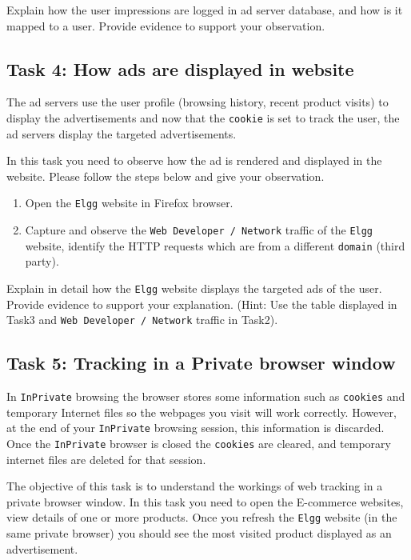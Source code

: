Explain how the user impressions are logged in ad server database, and how is it mapped to a user. 
Provide evidence to support your observation.

\subsection{Task 4: How ads are displayed in website}

The ad servers use the user profile (browsing history, recent product visits) to display the advertisements and now that the {\tt cookie} is set to track the user, 
the ad servers display the targeted advertisements. 

In this task you need to observe how the ad is rendered and displayed in the website. 
Please follow the steps below and give your observation.
\begin{enumerate}
  \item Open the {\tt Elgg} website in Firefox browser.
  \item Capture and observe the {\tt Web Developer / Network} traffic of the {\tt Elgg} website, identify the HTTP requests which are from a different {\tt domain} (third party).
\end{enumerate}

Explain in detail how the {\tt Elgg} website displays the targeted ads of the user. 
Provide evidence to support your explanation. 
(Hint: Use the table displayed in Task3 and {\tt Web Developer / Network} traffic in Task2).

\subsection{Task 5: Tracking in a Private browser window}


In {\tt InPrivate} browsing the browser stores some information such as {\tt cookies} and temporary Internet files so the webpages you visit will work correctly. 
However, at the end of your {\tt InPrivate} browsing session, this information is discarded. 
Once the {\tt InPrivate} browser is closed the {\tt cookies} are cleared, and temporary internet files are deleted for that session.

The objective of this task is to understand the workings of web tracking in a private browser window. 
In this task you need to open the E-commerce websites, view details of one or more products. 
Once you refresh the {\tt Elgg} website (in the same private browser) you should see the most visited product displayed as an advertisement.

